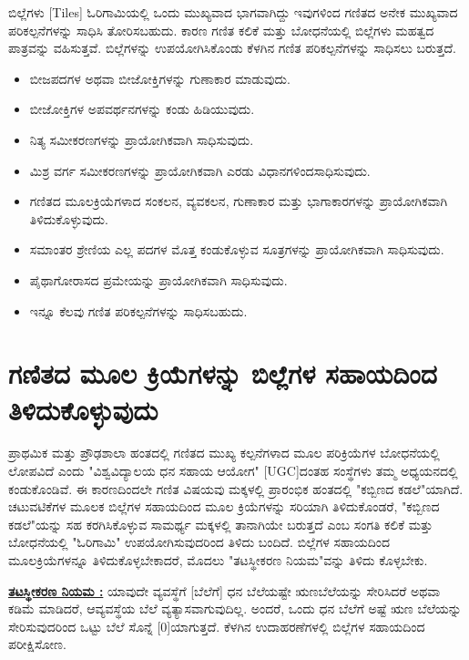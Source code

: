 ಬಿಲ್ಲೆಗಳು [Tiles] ಓರಿಗಾಮಿಯಲ್ಲಿ ಒಂದು ಮುಖ್ಯವಾದ ಭಾಗವಾಗಿದ್ದು ಇವುಗಳಿಂದ ಗಣಿತದ ಅನೇಕ ಮುಖ್ಯವಾದ ಪರಿಕಲ್ಪನೆಗಳನ್ನು ಸಾಧಿಸಿ ತೋರಿಸಬಹುದು. ಕಾರಣ ಗಣಿತ ಕಲಿಕೆ ಮತ್ತು ಬೋಧನೆಯಲ್ಲಿ ಬಿಲ್ಲೆಗಳು ಮಹತ್ವದ ಪಾತ್ರವನ್ನು ವಹಿಸುತ್ತವೆ. ಬಿಲ್ಲೆಗಳನ್ನು ಉಪಯೋಗಿಸಿಕೊಂಡು ಕೆಳಗಿನ ಗಣಿತ ಪರಿಕಲ್ಪನೆಗಳನ್ನು ಸಾಧಿಸಲು ಬರುತ್ತದೆ.
\begin{itemize}
\item ಬೀಜಪದಗಳ ಅಥವಾ ಬೀಜೋಕ್ತಿಗಳನ್ನು ಗುಣಾಕಾರ ಮಾಡುವುದು.
\item ಬೀಜೋಕ್ತಿಗಳ ಅಪವರ್ಥನಗಳನ್ನು ಕಂಡು ಹಿಡಿಯುವುದು. 
\item ನಿತ್ಯ ಸಮೀಕರಣಗಳನ್ನು ಪ್ರಾಯೋಗಿಕವಾಗಿ ಸಾಧಿಸುವುದು. 
\item ಮಿಶ್ರ ವರ್ಗ ಸಮೀಕರಣಗಳನ್ನು ಪ್ರಾಯೋಗಿಕವಾಗಿ ಎರಡು ವಿಧಾನಗಳಿಂದ\break ಸಾಧಿಸುವುದು. 
\item ಗಣಿತದ ಮೂಲಕ್ರಿಯೆಗಳಾದ ಸಂಕಲನ, ವ್ಯವಕಲನ, ಗುಣಾಕಾರ ಮತ್ತು ಭಾಗಾ\break ಕಾರಗಳನ್ನು ಪ್ರಾಯೋಗಿಕವಾಗಿ ತಿಳಿದುಕೊಳ್ಳುವುದು. 
\item ಸಮಾಂತರ ಶ್ರೇಣಿಯ ಎಲ್ಲ ಪದಗಳ ಮೊತ್ತ ಕಂಡುಕೊಳ್ಳುವ ಸೂತ್ರಗಳನ್ನು ಪ್ರಾಯೋಗಿಕವಾಗಿ ಸಾಧಿಸುವುದು.
\item ಪೈಥಾಗೋರಾಸದ ಪ್ರಮೇಯನ್ನು ಪ್ರಾಯೋಗಿಕವಾಗಿ ಸಾಧಿಸುವುದು.
\item ಇನ್ನೂ ಕೆಲವು ಗಣಿತ ಪರಿಕಲ್ಪನೆಗಳನ್ನು ಸಾಧಿಸಬಹುದು. 
\end{itemize}

\section{ಗಣಿತದ ಮೂಲ ಕ್ರಿಯೆಗಳನ್ನು ಬಿಲ್ಲೆಗಳ ಸಹಾಯದಿಂದ ತಿಳಿದು\break ಕೊಳ್ಳುವುದು}\label{sec3.2}%

ಪ್ರಾಥಮಿಕ ಮತ್ತು ಪ್ರೌಢಶಾಲಾ ಹಂತದಲ್ಲಿ ಗಣಿತದ ಮುಖ್ಯ ಕಲ್ಪನೆಗಳಾದ ಮೂಲ ಪರಿ\-ಕ್ರಿಯೆ\-ಗಳ ಬೋಧನೆಯಲ್ಲಿ ಲೋಪವಿದೆ ಎಂದು "ವಿಶ್ವವಿದ್ಯಾಲಯ ಧನ ಸಹಾಯ ಆಯೋಗ" [UGC]ದಂತಹ ಸಂಸ್ಥೆಗಳು ತಮ್ಮ ಅಧ್ಯಯನದಲ್ಲಿ ಕಂಡುಕೊಂಡಿವೆ. ಈ ಕಾರಣದಿಂದಲೇ ಗಣಿತ ವಿಷಯವು ಮಕ್ಕಳಲ್ಲಿ ಪ್ರಾರಂಭಿಕ ಹಂತದಲ್ಲಿ "ಕಬ್ಬಿಣದ ಕಡಲೆ"ಯಾಗಿದೆ. ಚಟುವಟಿಕೆಗಳ ಮೂಲಕ ಬಿಲ್ಲೆಗಳ ಸಹಾಯದಿಂದ ಮೂಲ ಕ್ರಿಯೆಗಳನ್ನು ಸರಿಯಾಗಿ ತಿಳಿದುಕೊಂಡರೆ, "ಕಬ್ಬಿಣದ ಕಡಲೆ"ಯನ್ನು ಸಹ ಕರಗಿಸಿಕೊಳ್ಳುವ ಸಾಮರ್ಥ್ಯ ಮಕ್ಕಳಲ್ಲಿ ತಾನಾಗಿಯೇ ಬರುತ್ತದೆ ಎಂಬ ಸಂಗತಿ ಕಲಿಕೆ ಮತ್ತು ಬೋಧನೆಯಲ್ಲಿ "ಓರಿಗಾಮಿ" ಉಪಯೋಗಿಸುವುದರಿಂದ ತಿಳಿದು ಬಂದಿದೆ. ಬಿಲ್ಲೆಗಳ ಸಹಾಯದಿಂದ ಮೂಲಕ್ರಿಯೆಗಳನ್ನೂ ತಿಳಿದುಕೊಳ್ಳಬೇಕಾದರೆ, ಮೊದಲು "ತಟಸ್ಥೀಕರಣ ನಿಯಮ"ವನ್ನು ತಿಳಿದು ಕೊಳ್ಳಬೇಕು.

\medskip
\noindent
\textbf{\underline{ತಟಸ್ಥೀಕರಣ ನಿಯಮ :}} ಯಾವುದೇ ವ್ಯವಸ್ಥೆಗೆ [ಬೆಲೆಗೆ] ಧನ ಬೆಲೆಯಷ್ಟೇ ಋಣಬೆಲೆ\-ಯನ್ನು ಸೇರಿಸಿದರೆ ಅಥವಾ ಕಡಿಮೆ ಮಾಡಿದರೆ, ಆವ್ಯವಸ್ಥೆಯ ಬೆಲೆ ವ್ಯತ್ಯಾಸವಾಗುವುದಿಲ್ಲ. \hbox{ಅಂದರೆ}, ಒಂದು ಧನ ಬೆಲೆಗೆ ಅಷ್ಟೆ ಋಣ ಬೆಲೆಯನ್ನು ಸೇರಿಸುವುದರಿಂದ ಒಟ್ಟು ಬೆಲೆ ಸೊನ್ನೆ [0]ಯಾಗುತ್ತದೆ. ಕೆಳಗಿನ ಉದಾಹರಣೆಗಳಲ್ಲಿ ಬಿಲ್ಲೆಗಳ ಸಹಾಯದಿಂದ ಪರೀಕ್ಷಿಸೋಣ.

